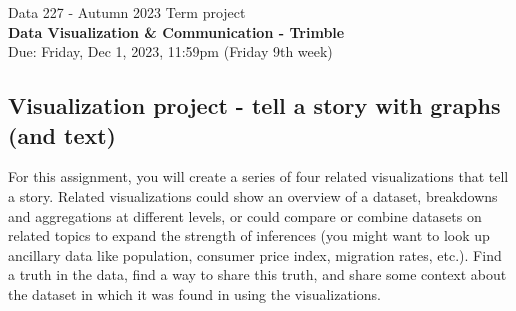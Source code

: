 \documentclass[]{book}
\theoremstyle{definition}
\begin{document}
\begin{center}
{\Large Data 227 - Autumn 2023 \hspace{0.5cm} Term project }\\
\textbf{Data Visualization \& Communication - Trimble}\\ %
Due:  Friday, Dec 1, 2023, 11:59pm (Friday 9th week) 
\end{center}

\vspace{0.2 cm}

\subsection*{Visualization project - tell a story with graphs (and text)}


For this assignment, you will create a series of four related visualizations that tell a story. Related visualizations could show an overview of a dataset, breakdowns and aggregations at different levels, or could compare or combine datasets on related topics to expand the strength of inferences (you might want to look up ancillary data like population, consumer price index, migration rates, etc.). Find a truth in the data, find a way to share this truth, and share some context about the dataset in which it was found in using the visualizations.
\end{document}
